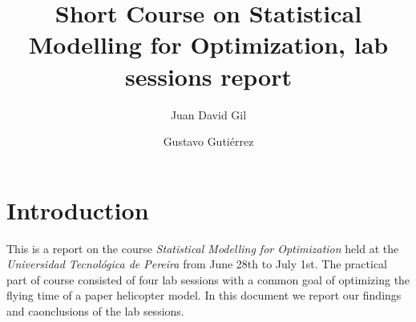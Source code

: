 \documentclass[DIV=20]{scrartcl}
\title{Short Course on Statistical Modelling for Optimization, lab sessions
report}
\author{Juan David Gil \and Gustavo Gutiérrez}
\date{}
\begin{document}
\maketitle
\section{Introduction}
This is a report on the course \emph{Statistical Modelling for Optimization}
held at the \emph{Universidad Tecnológica de Pereira} from June 28th to July
1st. The practical part of course consisted of four lab sessions with a common
goal of optimizing the flying time of a paper helicopter model. In this document
we report our findings and caonclusions of the lab sessions.



\end{document}
